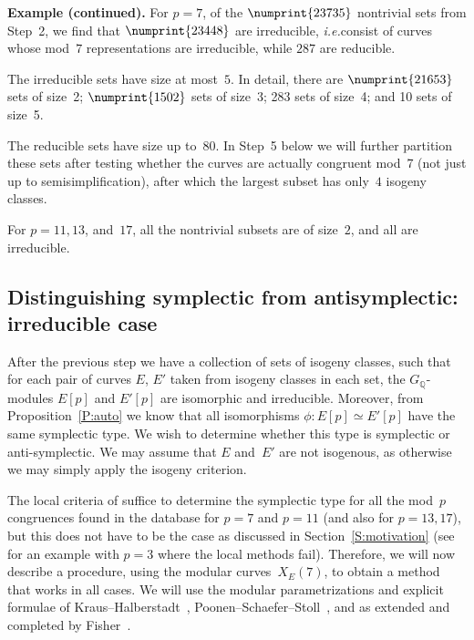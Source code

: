 \documentclass[12pt, reqno]{amsart}
\newcommand{\Q}{\mathbb{Q}}
\numberwithin{equation}{section}
\theoremstyle{definition}
\theoremstyle{remark}
\begin{document}
{\bf Example (continued).} For $p=7$, of the $\numprint{23735}$
nontrivial sets from Step~2, we find that $\numprint{23448}$ are
irreducible, {\it i.e.}\@ consist of curves whose mod~$7$
representations are irreducible, while $287$ are reducible.

The irreducible sets have size at most~$5$.  In detail, there are
$\numprint{21653}$ sets of size~2; $\numprint{1502}$ sets of size~3;
283 sets of size~4; and 10 sets of size~5.

The reducible sets have size up to~$80$.  In Step~5 below we will further
partition these sets after testing whether the curves are actually congruent
mod~7 (not just up to semisimplification), after which the largest subset has
only~$4$ isogeny classes.


For $p=11, 13$, and~$17$, all the nontrivial subsets are of size~$2$,
and all are irreducible.


\subsection{Distinguishing symplectic from antisymplectic: irreducible case}
After the previous step we have a collection of sets of isogeny
classes, such that for each pair of curves $E$, $E'$ taken from
isogeny classes in each set, the $G_{\Q}$-modules $E[p]$ and $E'[p]$
are isomorphic and irreducible. Moreover, from
Proposition~\ref{P:auto} we know that all isomorphisms $\phi : E[p]
\simeq E'[p]$ have the same symplectic type. We wish to determine
whether this type is symplectic or anti-symplectic.  We may assume
that $E$ and~$E'$ are not isogenous, as otherwise we may simply apply
the isogeny criterion.

The local criteria of \cite{FKSym} suffice to determine the symplectic
type for all the mod~$p$ congruences found in the database for $p=7$
and $p=11$ (and also for $p=13, 17$), but this does not have to be
the case as discussed in Section~\ref{S:motivation} (see
\cite[Proposition~16]{FKSym} for an example with $p=3$ where the local
methods fail).  Therefore, we will now describe a procedure, using the
modular curves~$X_E(7)$, to obtain a method that works in all cases.
We will use the modular parametrizations and explicit formulae of
Kraus--Halberstadt~\cite{Halberstadt-Kraus-XE7},
Poonen--Schaefer--Stoll~\cite{PSS}, and as extended and completed by
Fisher~\cite{Fisher}.
\end{document}
